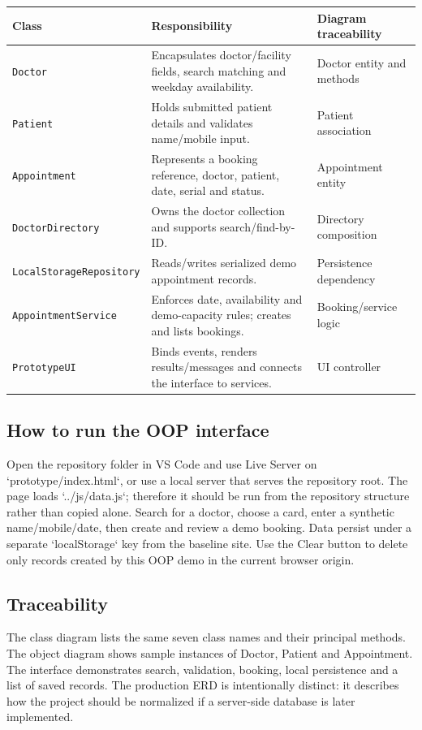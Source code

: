 \documentclass[11pt,a4paper]{article}
\begin{document}
\begin{tabularx}{\textwidth}{p{3.3cm}X p{3.3cm}}
\toprule \textbf{Class} & \textbf{Responsibility} & \textbf{Diagram traceability}\\\midrule
\texttt{Doctor} & Encapsulates doctor/facility fields, search matching and weekday availability. & Doctor entity and methods\\
\texttt{Patient} & Holds submitted patient details and validates name/mobile input. & Patient association\\
\texttt{Appointment} & Represents a booking reference, doctor, patient, date, serial and status. & Appointment entity\\
\texttt{DoctorDirectory} & Owns the doctor collection and supports search/find-by-ID. & Directory composition\\
\texttt{LocalStorageRepository} & Reads/writes serialized demo appointment records. & Persistence dependency\\
\texttt{AppointmentService} & Enforces date, availability and demo-capacity rules; creates and lists bookings. & Booking/service logic\\
\texttt{PrototypeUI} & Binds events, renders results/messages and connects the interface to services. & UI controller\\
\bottomrule
\end{tabularx}

\subsection{How to run the OOP interface}
Open the repository folder in VS Code and use Live Server on `prototype/index.html`, or use a local server that serves the repository root. The page loads `../js/data.js`; therefore it should be run from the repository structure rather than copied alone. Search for a doctor, choose a card, enter a synthetic name/mobile/date, then create and review a demo booking. Data persist under a separate `localStorage` key from the baseline site. Use the Clear button to delete only records created by this OOP demo in the current browser origin.

\subsection{Traceability}
The class diagram lists the same seven class names and their principal methods. The object diagram shows sample instances of Doctor, Patient and Appointment. The interface demonstrates search, validation, booking, local persistence and a list of saved records. The production ERD is intentionally distinct: it describes how the project should be normalized if a server-side database is later implemented.
\end{document}
